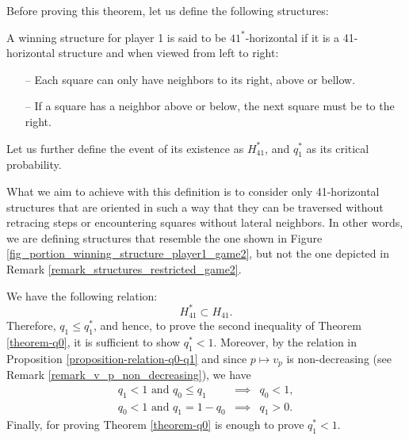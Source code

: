        Before proving this theorem, let us define the following structures:
       \begin{definition}\label{definition_structures_restricted_game2}
            A winning structure for player 1 is said to be $41^*$-horizontal if it is a 41-horizontal structure and when viewed from left to right: 
            \begin{itemize}
                \item[--] Each square can only have neighbors to its right, above or bellow.
                \item[--] If a square has a neighbor above or below, the next square must be to the right.
            \end{itemize}
        \end{definition}
        \noindent Let us further define the event of its existence as $H_{41}^*$, and $q^*_1$ as its critical probability.

        What we aim to achieve with this definition is to consider only 41-horizontal structures that are oriented in such a way that they can be traversed without retracing steps or encountering squares without lateral neighbors. In other words, we are defining structures that resemble the one shown in Figure \ref{fig_portion_winning_structure_player1_game2}, but not the one depicted in Remark \ref{remark_structures_restricted_game2}.

       We have the following relation:
       \[
            H_{41}^* \subset H_{41}.
       \]
       Therefore, $q_1 \leq q_1^*$, and hence, to prove the second inequality of Theorem \ref{theorem-q0}, it is sufficient to show $q_1^* < 1$. Moreover, by the relation in Proposition \ref{proposition-relation-q0-q1} and since $p \mapsto v_p$ is non-decreasing (see Remark \ref{remark_v_p_non_decreasing}), we have
       \begin{eqnarray*}
            q_1 < 1 \text{ and } q_0 \leq q_1 & \implies & q_0 < 1, \\
            q_0 < 1 \text{ and } q_1 = 1 - q_0  & \implies & q_1 > 0.  
       \end{eqnarray*}
        Finally, for proving Theorem \ref{theorem-q0} is enough to prove $q_1^* < 1$. 

